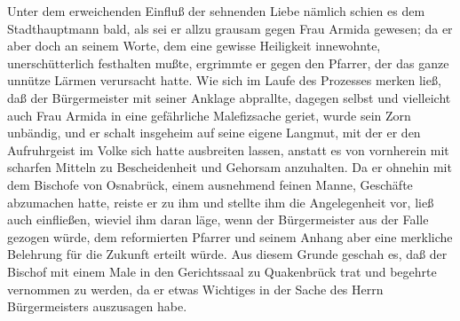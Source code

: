 Unter dem erweichenden Einfluß der sehnenden Liebe nämlich schien
es dem Stadthauptmann bald, als sei er allzu grausam gegen Frau
Armida gewesen; da er aber doch an seinem Worte, dem eine gewisse
Heiligkeit innewohnte, unerschütterlich festhalten mußte, ergrimmte
er gegen den Pfarrer, der das ganze unnütze Lärmen verursacht
hatte. Wie sich im Laufe des Prozesses merken ließ, daß der
Bürgermeister mit seiner Anklage abprallte, dagegen selbst und
vielleicht auch Frau Armida in eine gefährliche Malefizsache
geriet, wurde sein Zorn unbändig, und er schalt insgeheim auf seine
eigene Langmut, mit der er den Aufruhrgeist im Volke sich hatte
ausbreiten lassen, anstatt es von vornherein mit scharfen Mitteln
zu Bescheidenheit und Gehorsam anzuhalten. Da er ohnehin mit dem
Bischofe von Osnabrück, einem ausnehmend feinen Manne, Geschäfte
abzumachen hatte, reiste er zu ihm und stellte ihm die
Angelegenheit vor, ließ auch einfließen, wieviel ihm daran läge,
wenn der Bürgermeister aus der Falle gezogen würde, dem
reformierten Pfarrer und seinem Anhang aber eine \pagenum{[38]}
merkliche Belehrung für die Zukunft erteilt würde. Aus diesem
Grunde geschah es, daß der Bischof mit einem Male in den
Gerichtssaal zu Quakenbrück trat und begehrte vernommen zu werden,
da er etwas Wichtiges in der Sache des Herrn Bürgermeisters
auszusagen habe.

